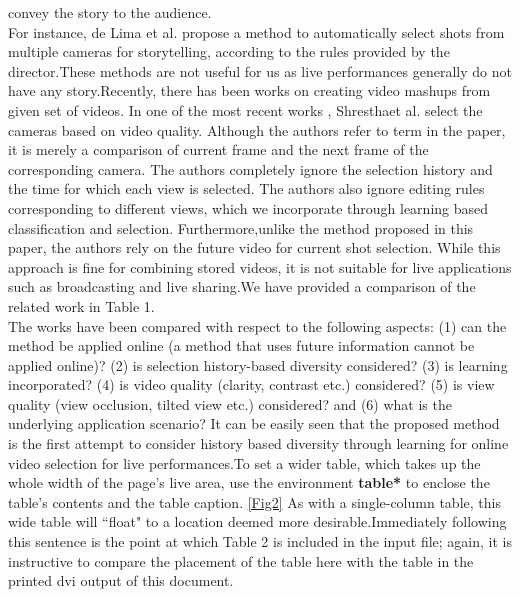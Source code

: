 \documentclass{IEEEtran}
\begin{document}
convey the story to the audience.\\
For instance, de Lima et al. \cite{web:9}propose a method to automatically select shots from multiple cameras for storytelling, according to the rules provided by the director.These methods are not useful for us as live performances generally
do not have any story.Recently, there has been works on creating video mashups from given set of videos. In one of the most recent works \cite{web:15}, Shresthaet al. select the cameras based on video quality. Although the authors refer to term  in the paper, it is merely a comparison of current frame and the next frame of the corresponding camera. The authors completely ignore the selection history and the time for which each view is selected. The authors also ignore editing rules corresponding to different views, which we incorporate
through learning based classification and selection. Furthermore,unlike the method proposed in this paper, the authors rely on the future video for current shot selection. While this approach is fine for combining stored videos, it is not suitable for live applications
such as broadcasting and live sharing.We have provided a comparison of the related work in Table 1.\\
The works have been compared with respect to the following aspects: (1) can the method be applied online (a method that uses \cite{web:4}future information cannot be applied online)? (2) is selection history-based diversity considered? (3) is learning incorporated? (4) is video quality (clarity, contrast etc.) considered? (5) is view quality (view occlusion, tilted view etc.) considered? and (6) what is the underlying application scenario? It can be easily seen that the proposed method is the first attempt to consider history based diversity through learning for online video selection for live performances.To set a wider table, which takes up the whole width of the page's live area, use the environment \textbf{table*} to enclose the table's contents and the table caption. \ref{Fig2} As with a single-column table, this wide table will ``float" to a location deemed more desirable.Immediately following this sentence is the point at which Table 2 is included in the input file; again, it is instructive to compare the placement of the table here with the table in the printed dvi output of this document.
\end{document}
